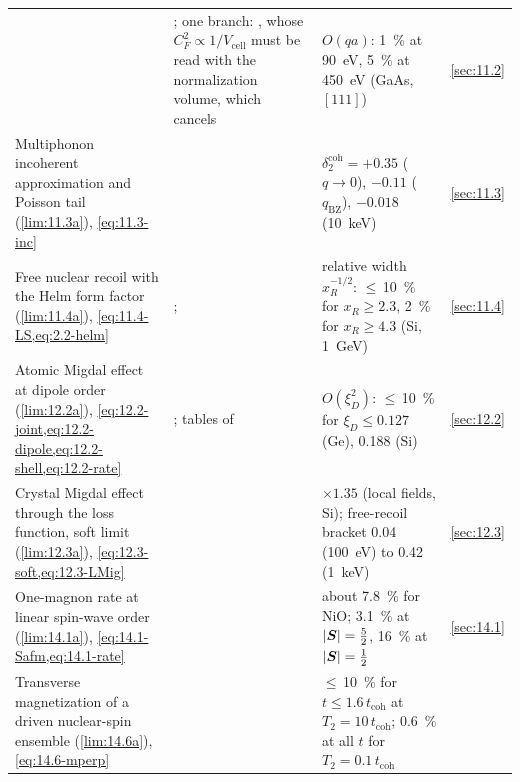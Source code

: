 {\begin{longtable}{@{}>{\raggedright\arraybackslash}p{}>{\raggedright\arraybackslash}p{}>{\raggedright\arraybackslash}p{}>{\raggedright\arraybackslash}p{}@{}}
& \cites[Eqs.~(92), (105), (106)]{trickle2020multichannel}[Eqs.~(19), (23), v1 numbering]{griffin2018directional}[Eq.~(61)]{trickle2022effective}; one branch: \cite[Eqs.~(4)--(7)]{knapen2018detection}, whose $C_F^2 \propto 1/V_{\mathrm{cell}}$ must be read with the normalization volume, which cancels
& $O(qa)$: \SI{1}{\percent} at \SI{90}{eV}, \SI{5}{\percent} at \SI{450}{eV} (GaAs, $[111]$)
& \cref{sec:11.2} \\
Multiphonon incoherent approximation and Poisson tail (\cref{lim:11.3a}), \cref{eq:11.3-inc}
& \cites[Eqs.~(15), (23), (24), (36)]{campbelldeem2022dark}[Eqs.~(7), (10)]{kahn2021dark}[Eq.~(12)]{campbelldeem2020multiphonon}
& $\delta^{\mathrm{coh}}_2 = +0.35$ ($q \to 0$), $-0.11$ ($q_{\mathrm{BZ}}$), $-0.018$ (\SI{10}{keV})
& \cref{sec:11.3} \\
Free nuclear recoil with the Helm form factor (\cref{lim:11.4a}), \cref{eq:11.4-LS,eq:2.2-helm}
& \cites[Eqs.~(37)--(39), (42)]{campbelldeem2022dark}[Eq.~(104)]{lin2019tasi}{lewin1996review}; \cites[Eqs.~(90)--(92)]{kahn2022searches}[Eqs.~(4), (12)]{kahn2021dark}
& relative width $x_R^{-1/2}$: $\le$\,\SI{10}{\percent} for $x_R \ge 2.3$, \SI{2}{\percent} for $x_R \ge 4.3$ (Si, \SI{1}{GeV})
& \cref{sec:11.4} \\
Atomic Migdal effect at dipole order (\cref{lim:12.2a}), \cref{eq:12.2-joint,eq:12.2-dipole,eq:12.2-shell,eq:12.2-rate}
& \cite[Eqs.~(55), (57), (73), (86)--(92)]{ibe2018migdal}; tables of \cite{cox2023precise}
& $O(\xi_D^2)$: $\le$\,\SI{10}{\percent} for $\xi_D \le 0.127$ (Ge), 0.188 (Si)
& \cref{sec:12.2} \\
Crystal Migdal effect through the loss function, soft limit (\cref{lim:12.3a}), \cref{eq:12.3-soft,eq:12.3-LMig}
& \cite[Eq.~(6)]{knapen2021migdal}
& $\times1.35$ (local fields, Si); free-recoil bracket 0.04 (\SI{100}{eV}) to 0.42 (\SI{1}{keV})
& \cref{sec:12.3} \\
One-magnon rate at linear spin-wave order (\cref{lim:14.1a}), \cref{eq:14.1-Safm,eq:14.1-rate}
& \cites[Eqs.~(5)--(12)]{trickle2020detecting}[Eqs.~(34), (38)]{trickle2022effective}
& about \SI{7.8}{\percent} for NiO; \SI{3.1}{\percent} at $|\bm{S}| = \frac52$, \SI{16}{\percent} at $|\bm{S}| = \frac12$
& \cref{sec:14.1} \\
Transverse magnetization of a driven nuclear-spin ensemble (\cref{lim:14.6a}), \cref{eq:14.6-mperp}
& \cites[Eq.~(1)]{budker2014proposal}[Eq.~(1) and Eqs.~(S22)--(S25), (S41), (S53)]{aybas2021search}
& $\le$\,\SI{10}{\percent} for $t \le 1.6\,t_{\mathrm{coh}}$ at $T_2 = 10\,t_{\mathrm{coh}}$; \SI{0.6}{\percent} at all $t$ for $T_2 = 0.1\,t_{\mathrm{coh}}$

\end{longtable}}
